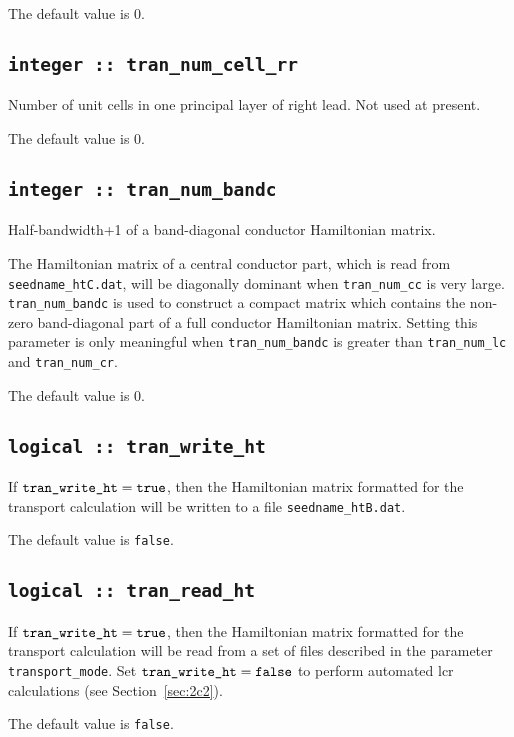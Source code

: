 The default value is 0. 
 
\subsection[tran\_num\_cell\_rr]{\tt integer :: tran\_num\_cell\_rr}
Number of unit cells in one principal layer of right lead. 
Not used at present.

The default value is 0.

\subsection[tran\_num\_bandc]{\tt integer :: tran\_num\_bandc}

Half-bandwidth+1 of a band-diagonal conductor Hamiltonian matrix.

The Hamiltonian matrix of a central conductor part, which is
read from \verb#seedname_htC.dat#, will be diagonally dominant
when \verb#tran_num_cc# is very large.
\verb#tran_num_bandc# is used to construct
a compact matrix which contains
the non-zero band-diagonal part of a full conductor Hamiltonian matrix. 
Setting this parameter is only meaningful when
\verb#tran_num_bandc# is greater than
\verb#tran_num_lc# and \verb#tran_num_cr#.

The default value is 0.

\subsection[tran\_write\_ht]{\tt logical :: tran\_write\_ht}

If $\verb#tran_write_ht#=\verb#true#$, then the Hamiltonian matrix 
formatted for the transport calculation will be written 
to a file \verb#seedname_htB.dat#.

The default value is {\tt false}.

\subsection[tran\_read\_ht]{\tt logical :: tran\_read\_ht}

If $\verb#tran_write_ht#=\verb#true#$, then the Hamiltonian matrix
formatted for the transport calculation will be read
from a set of files described in the
parameter \verb#transport_mode#. 
Set $\verb#tran_write_ht#=\verb#false#$ to perform automated 
lcr calculations (see Section~\ref{sec:2c2}).

The default value is {\tt false}.

